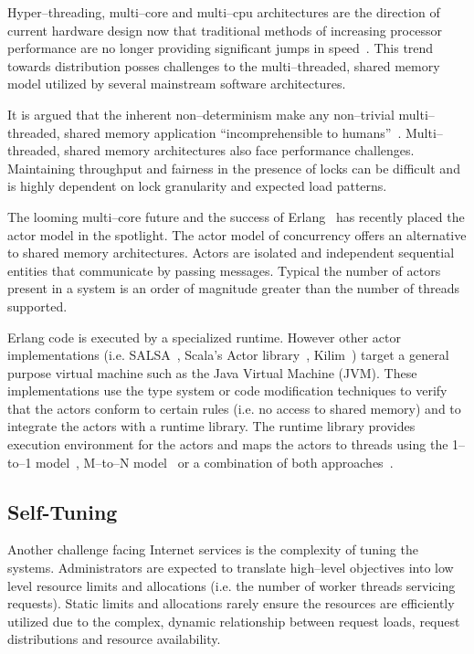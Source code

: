 \documentclass[conference]{IEEEtran}
\begin{document}
Hyper--threading, multi--core and multi--cpu architectures are the direction of current hardware design now that traditional methods of increasing processor performance are no longer providing significant jumps in speed~\cite{Sutter05Concurrency}. This trend towards distribution posses challenges to the multi--threaded, shared memory model utilized by several mainstream software architectures.

It is argued that  the inherent non--determinism make any non--trivial multi--threaded, shared memory application ``incomprehensible to humans''~\cite{Lee06ThreadProblems}. Multi--threaded, shared memory architectures also face performance challenges. Maintaining throughput and fairness in the presence of locks can be difficult and is highly dependent on lock granularity and expected load patterns.

The looming multi--core future and the success of Erlang~\cite{armstrong96erlang} has recently placed the actor model in the spotlight. The actor model of concurrency offers an alternative to shared memory architectures. Actors are isolated and independent sequential entities that communicate by passing messages. Typical the number of actors present in a system is an order of magnitude greater than the number of threads supported.

Erlang code is executed by a specialized runtime. However other actor implementations (i.e. SALSA~\cite{Varela:SALSA}, Scala's Actor library~\cite{Haller:07:ScalaActors}, Kilim~\cite{Srinivasan:08:Kilim}) target a general purpose virtual machine such as the Java Virtual Machine (JVM). These implementations use the type system or code modification techniques to verify that the actors conform to certain rules (i.e. no access to shared memory) and to integrate the actors with a runtime library. The runtime library provides execution environment for the actors and maps the actors to threads using the 1--to--1 model~\cite{Varela:SALSA}, M--to--N model~\cite{Srinivasan:08:Kilim,armstrong96erlang} or a combination of both approaches~\cite{Haller:07:ScalaActors}.

\subsection{Self-Tuning}

Another challenge facing Internet services is the complexity of tuning the systems. Administrators are expected to translate high--level objectives into low level resource limits and allocations (i.e. the number of worker threads servicing requests). Static limits and allocations rarely ensure the resources are efficiently utilized due to the complex, dynamic relationship between request loads, request distributions and resource availability. 
\end{document}
